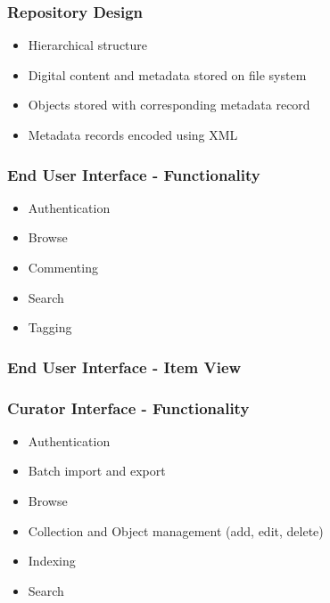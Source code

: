 \documentclass[xcolor=dvitex,t,11pt]{beamer}
\begin{document}
\begin{frame}[fragile]
\frametitle{Repository Design}
\begin{figure}
\centering
\framebox[\textwidth]{%

}
\end{figure}
\begin{itemize}
\item<1-> Hierarchical structure
\item<2-> Digital content and metadata stored on file system
\item<3-> Objects stored with corresponding metadata record
\item<4-> Metadata records encoded using XML
\end{itemize}
\begin{figure}
\end{figure}
\end{frame}

\begin{frame}[fragile]
\frametitle{End User Interface - Functionality}
\begin{figure}
\centering
\framebox[\textwidth]{%

}
\end{figure}
\begin{itemize}
\item<1-> Authentication
\item<2-> Browse
\item<3-> Commenting
\item<4-> Search
\item<5-> Tagging
\end{itemize}
\end{frame}

\begin{frame}[fragile]
\frametitle{End User Interface - Item View}
\begin{figure}
\centering
{}
\end{figure}
\end{frame}

\begin{frame}[fragile]
\frametitle{Curator Interface - Functionality}
\begin{figure}
\centering
\framebox[\textwidth]{%

}
\end{figure}
\begin{itemize}
\item<1-> Authentication
\item<2-> Batch import and export
\item<3-> Browse
\item<4-> Collection and Object management (add, edit, delete)
\item<5-> Indexing
\item<6-> Search
\end{itemize}
\end{frame}
\end{document}
